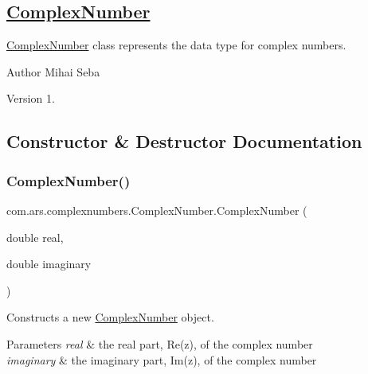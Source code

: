 \subsection*{\hyperlink{classcom_1_1ars_1_1complexnumbers_1_1_complex_number}{Complex\+Number}}

\hyperlink{classcom_1_1ars_1_1complexnumbers_1_1_complex_number}{Complex\+Number} class represents the data type for complex numbers.

\begin{DoxyAuthor}{Author}
Mihai Seba 
\end{DoxyAuthor}
\begin{DoxyVersion}{Version}
1. 
\end{DoxyVersion}


\subsection{Constructor \& Destructor Documentation}
\hypertarget{classcom_1_1ars_1_1complexnumbers_1_1_complex_number_a8798b32c39932a90436b5ef1d8bd83a4}{}\label{classcom_1_1ars_1_1complexnumbers_1_1_complex_number_a8798b32c39932a90436b5ef1d8bd83a4} 
\subsubsection{\texorpdfstring{Complex\+Number()}{ComplexNumber()}\hspace{0.1cm}{\footnotesize\ttfamily [1/2]}}
{\footnotesize\ttfamily com.\+ars.\+complexnumbers.\+Complex\+Number.\+Complex\+Number (\begin{DoxyParamCaption}\item[{double}]{real,  }\item[{double}]{imaginary }\end{DoxyParamCaption})}

Constructs a new {\ttfamily \hyperlink{classcom_1_1ars_1_1complexnumbers_1_1_complex_number}{Complex\+Number}} object. 
\begin{DoxyParams}{Parameters}
{\em real} & the real part, Re(z), of the complex number \\
\hline
{\em imaginary} & the imaginary part, Im(z), of the complex number \\
\hline
\end{DoxyParams}
\hypertarget{classcom_1_1ars_1_1complexnumbers_1_1_complex_number_a5c911c206c51fe7c3558e32147d22d12}{}\label{classcom_1_1ars_1_1complexnumbers_1_1_complex_number_a5c911c206c51fe7c3558e32147d22d12} 
